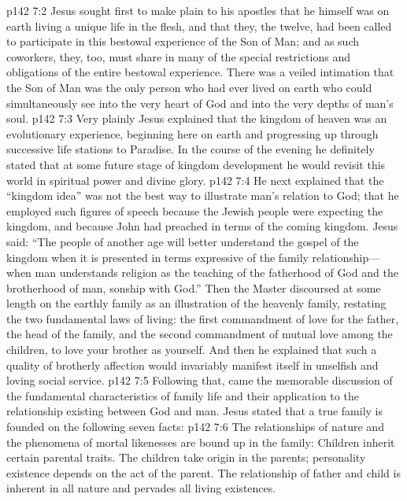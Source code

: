 \vs p142 7:2 Jesus sought first to make plain to his apostles that he himself was on earth living a unique life in the flesh, and that they, the twelve, had been called to participate in this bestowal experience of the Son of Man; and as such coworkers, they, too, must share in many of the special restrictions and obligations of the entire bestowal experience. There was a veiled intimation that the Son of Man was the only person who had ever lived on earth who could simultaneously see into the very heart of God and into the very depths of man’s soul.
\vs p142 7:3 Very plainly Jesus explained that the kingdom of heaven was an evolutionary experience, beginning here on earth and progressing up through successive life stations to Paradise. In the course of the evening he definitely stated that at some future stage of kingdom development he would revisit this world in spiritual power and divine glory.
\vs p142 7:4 He next explained that the “kingdom idea” was not the best way to illustrate man’s relation to God; that he employed such figures of speech because the Jewish people were expecting the kingdom, and because John had preached in terms of the coming kingdom. Jesus said: \textcolor{ubdarkred}{“The people of another age will better understand the gospel of the kingdom when it is presented in terms expressive of the family relationship---when man understands religion as the teaching of the fatherhood of God and the brotherhood of man, sonship with God.”} Then the Master discoursed at some length on the earthly family as an illustration of the heavenly family, restating the two fundamental laws of living: the first commandment of love for the father, the head of the family, and the second commandment of mutual love among the children, to love your brother as yourself. And then he explained that such a quality of brotherly affection would invariably manifest itself in unselfish and loving social service.
\vs p142 7:5 Following that, came the memorable discussion of the fundamental characteristics of family life and their application to the relationship existing between God and man. Jesus stated that a true family is founded on the following seven facts:
\pc \vs p142 7:6 \bibnobreakspace {} The relationships of nature and the phenomena of mortal likenesses are bound up in the family: Children inherit certain parental traits. The children take origin in the parents; personality existence depends on the act of the parent. The relationship of father and child is inherent in all nature and pervades all living existences.
